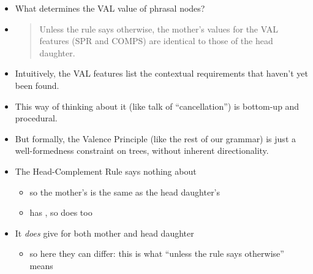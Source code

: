 \documentclass[a4paper,landscape,headrule,footrule]{foils}
\begin{document}
\begin{itemize}
\item What determines the VAL value of phrasal nodes?
\item {}
  \begin{quote}
    Unless the rule says otherwise, the mother’s
    values for the VAL features (SPR and
    COMPS) are identical to those of the head
    daughter.
  \end{quote}
\end{itemize}


\begin{itemize}
\item Intuitively, the VAL features list the contextual
requirements that haven’t yet been found.
\item This way of thinking about it (like talk of
``cancellation'') is bottom-up and procedural.
\item But formally, the Valence Principle (like the rest of
our grammar) is just a well-formedness constraint
on trees, without inherent directionality.

\end{itemize}

\begin{itemize}
\item The Head-Complement Rule says nothing about 
  \begin{itemize}
  \item so the mother's  is the same as the head daughter's
  \item \lex{devour} has \ft{spr} \avm{< NP >}, so
     does too
  \end{itemize}
\item It \emph{does} give  for both mother and head daughter
  \begin{itemize}
  \item so here they can differ:
    this is what ``unless the rule says otherwise'' means
  \end{itemize}
\end{itemize}
\end{document}
